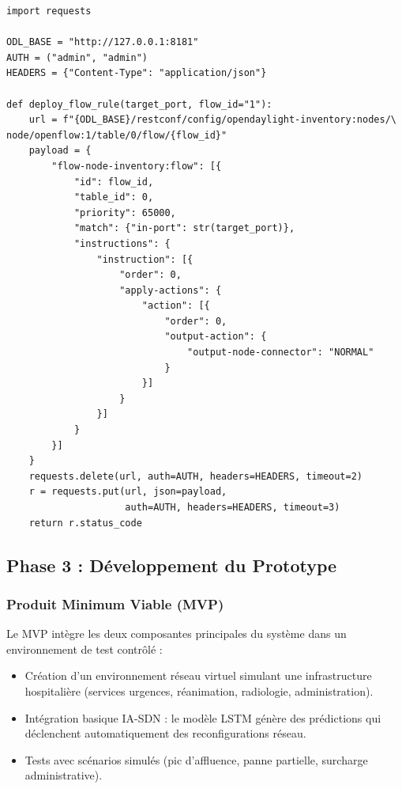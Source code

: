 \documentclass[12pt,a4paper]{article}
\begin{document}
\begin{lstlisting}[caption={Appel API REST vers OpenDaylight pour déploiement de règles OpenFlow}]
import requests

ODL_BASE = "http://127.0.0.1:8181"
AUTH = ("admin", "admin")
HEADERS = {"Content-Type": "application/json"}

def deploy_flow_rule(target_port, flow_id="1"):
    url = f"{ODL_BASE}/restconf/config/opendaylight-inventory:nodes/\
node/openflow:1/table/0/flow/{flow_id}"
    payload = {
        "flow-node-inventory:flow": [{
            "id": flow_id,
            "table_id": 0,
            "priority": 65000,
            "match": {"in-port": str(target_port)},
            "instructions": {
                "instruction": [{
                    "order": 0,
                    "apply-actions": {
                        "action": [{
                            "order": 0,
                            "output-action": {
                                "output-node-connector": "NORMAL"
                            }
                        }]
                    }
                }]
            }
        }]
    }
    requests.delete(url, auth=AUTH, headers=HEADERS, timeout=2)
    r = requests.put(url, json=payload,
                     auth=AUTH, headers=HEADERS, timeout=3)
    return r.status_code
\end{lstlisting}

\subsection{Phase 3 : Développement du Prototype}

\subsubsection{Produit Minimum Viable (MVP)}

Le MVP intègre les deux composantes principales du système dans un environnement de test contrôlé :

\begin{itemize}[leftmargin=1.5cm]
  \item Création d'un environnement réseau virtuel simulant une infrastructure hospitalière (services urgences, réanimation, radiologie, administration).
  \item Intégration basique IA-SDN : le modèle LSTM génère des prédictions qui déclenchent automatiquement des reconfigurations réseau.
  \item Tests avec scénarios simulés (pic d'affluence, panne partielle, surcharge administrative).
\end{itemize}
\end{document}
